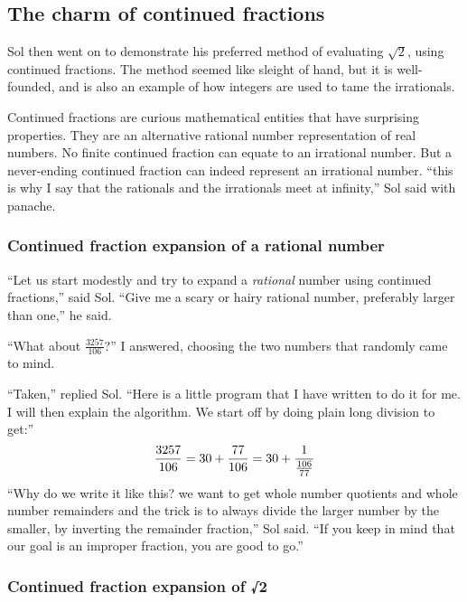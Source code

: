 \documentclass[
  a4paper,
]{article}
\begin{document}
\hypertarget{the-charm-of-continued-fractions}{%
\subsection{The charm of continued
fractions}\label{the-charm-of-continued-fractions}}

Sol then went on to demonstrate his preferred method of evaluating
\(\sqrt{2}\), using continued fractions. The method seemed like sleight
of hand, but it is well-founded, and is also an example of how integers
are used to tame the irrationals.

Continued fractions are curious mathematical entities that have
surprising properties. They are an alternative rational number
representation of real numbers. No finite continued fraction can equate
to an irrational number. But a never-ending continued fraction can
indeed represent an irrational number. ``this is why I say that the
rationals and the irrationals meet at infinity,'' Sol said with panache.

\hypertarget{continued-fraction-expansion-of-a-rational-number}{%
\subsubsection{Continued fraction expansion of a rational
number}\label{continued-fraction-expansion-of-a-rational-number}}

``Let us start modestly and try to expand a \emph{rational} number using
continued fractions,'' said Sol. ``Give me a scary or hairy rational
number, preferably larger than one,'' he said.

``What about \(\frac{3257}{106}\)?'' I answered, choosing the two
numbers that randomly came to mind.

``Taken,'' replied Sol. ``Here is a little program that I have written
to do it for me. I will then explain the algorithm. We start off by
doing plain long division to get:'' \[
\frac{3257}{106} = 30 + \frac{77}{106} = 30 + \frac{1}{\frac{106}{77}}\\
\] ``Why do we write it like this? we want to get whole number quotients
and whole number remainders and the trick is to always divide the larger
number by the smaller, by inverting the remainder fraction,'' Sol said.
``If you keep in mind that our goal is an improper fraction, you are
good to go.''

\hypertarget{continued-fraction-expansion-of-2}{%
\subsubsection{Continued fraction expansion of
√2}\label{continued-fraction-expansion-of-2}}
\end{document}
